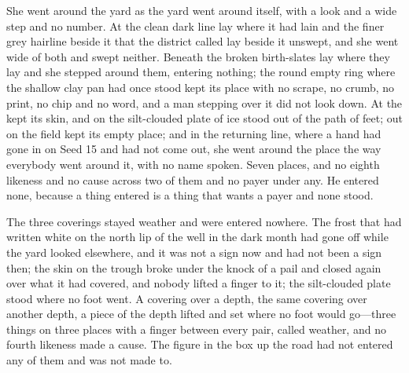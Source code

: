 She went around the yard as the yard went around itself, with a look and a wide step and no number. At  the clean dark line lay where it had lain and the finer grey hairline beside it that the district called  lay beside it unswept, and she went wide of both and swept neither. Beneath  the broken birth-slates lay where they lay and she stepped around them, entering nothing; the round empty ring where the shallow clay pan had once stood kept its place with no scrape, no crumb, no print, no chip and no word, and a man stepping over it did not look down. At  the  kept its skin, and on  the silt-clouded plate of ice stood out of the path of feet; out on  the field kept its empty place; and in the returning line, where a hand had gone in on Seed 15 and had not come out, she went around the place the way everybody went around it, with no name spoken. Seven places, and no eighth likeness and no cause across two of them and no payer under any. He entered none, because a thing entered is a thing that wants a payer and none stood.

The three coverings stayed weather and were entered nowhere. The frost that had written white on the north lip of the well in the dark month had gone off while the yard looked elsewhere, and it was not a sign now and had not been a sign then; the skin on the trough broke under the knock of a pail and closed again over what it had covered, and nobody lifted a finger to it; the silt-clouded plate stood where no foot went. A covering over a depth, the same covering over another depth, a piece of the depth lifted and set where no foot would go---three things on three places with a finger between every pair, called weather, and no fourth likeness made a cause. The figure in the box up the road had not entered any of them and was not made to.

\scenebreak

